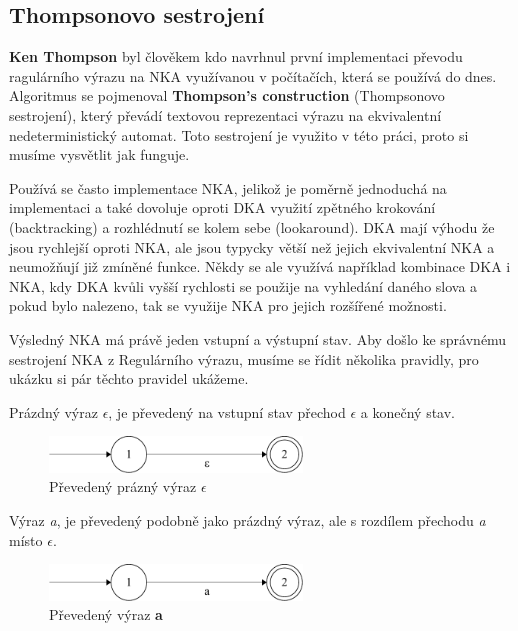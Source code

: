 \subsection*{Thompsonovo sestrojení}

\textbf{Ken Thompson} byl člověkem kdo navrhnul první implementaci převodu ragulárního výrazu na NKA využívanou v počítačích, která se používá do dnes. 
Algoritmus se pojmenoval \textbf{Thompson's construction} (Thompsonovo sestrojení), který převádí textovou reprezentaci výrazu na ekvivalentní nedeterministický automat.
Toto sestrojení je využito v této práci, proto si musíme vysvětlit jak funguje.

Používá se často implementace NKA, jelikož je poměrně jednoduchá na implementaci a
také dovoluje oproti DKA využití zpětného krokování (backtracking) a rozhlédnutí se kolem sebe (lookaround).
DKA mají výhodu že jsou rychlejší oproti NKA, ale jsou typycky větší než jejich ekvivalentní NKA a neumožňují již zmíněné funkce. 
Někdy se ale využívá například kombinace DKA i NKA, kdy DKA kvůli vyšší rychlosti se použije na vyhledání daného slova a pokud bylo nalezeno, 
tak se využije NKA pro jejich rozšířené možnosti.

Výsledný NKA má právě jeden vstupní a výstupní stav. Aby došlo ke správnému sestrojení NKA z Regulárního výrazu, musíme se řídit několika pravidly, pro ukázku si pár těchto pravidel ukážeme.

Prázdný výraz \textit{$\epsilon$}, je převedený na vstupní stav přechod \textit{$\epsilon$} a konečný stav.
\begin{figure}[!h]
	\centering
	\includegraphics[width=0.6\textwidth]{Figures/NFA_epsilon.pdf}
	\caption{Převedený prázný výraz \textbf{$\epsilon$}}
	\label{fig:NFAepsilon}
\end{figure}

Výraz \textit{a}, je převedený podobně jako prázdný výraz, ale s rozdílem přechodu \textit{a} místo \textit{$\epsilon$}.
\begin{figure}[!h]
	\centering
	\includegraphics[width=0.6\textwidth]{Figures/NFA_a.pdf}
	\caption{Převedený výraz \textbf{a}}
	\label{fig:NFAa}
\end{figure}


